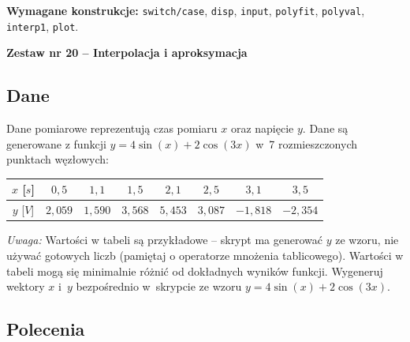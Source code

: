 \documentclass[a4paper,11pt]{article}
\begin{document}
\vspace{0.3cm}
\begin{ramka}
\textbf{Wymagane konstrukcje:}
\texttt{switch/case}, \texttt{disp}, \texttt{input}, \texttt{polyfit}, \texttt{polyval}, \texttt{interp1}, \texttt{plot}.
\end{ramka}

\clearpage
\begin{center}
  {\large\bfseries Zestaw nr 20 \quad -- \quad Interpolacja i aproksymacja}
\end{center}
\hrulefill
\vspace{0.4cm}

\subsection*{Dane}

Dane pomiarowe reprezentują czas pomiaru $x$ oraz napięcie $y$.
Dane są generowane z funkcji $y = 4\sin(x) + 2\cos(3x)$ w~7 rozmieszczonych punktach węzłowych:

\begin{center}
\begin{tabular}{c|ccccccc}
  \toprule
  $x$ [$s$] & $0{,}5$ & $1{,}1$ & $1{,}5$ & $2{,}1$ & $2{,}5$ & $3{,}1$ & $3{,}5$ \\
  \midrule
  $y$ [$V$] & $2{,}059$ & $1{,}590$ & $3{,}568$ & $5{,}453$ & $3{,}087$ & $-1{,}818$ & $-2{,}354$ \\
  \bottomrule
\end{tabular}
\end{center}

\medskip
\textit{Uwaga:} Wartości w tabeli są przykładowe – skrypt ma generować $y$ ze wzoru, nie używać gotowych liczb (pamiętaj o operatorze mnożenia tablicowego). Wartości w tabeli mogą się minimalnie różnić od dokładnych wyników funkcji.
Wygeneruj wektory $x$ i~$y$ bezpośrednio w~skrypcie ze wzoru $y = 4\sin(x) + 2\cos(3x)$.

\subsection*{Polecenia}
\end{document}
